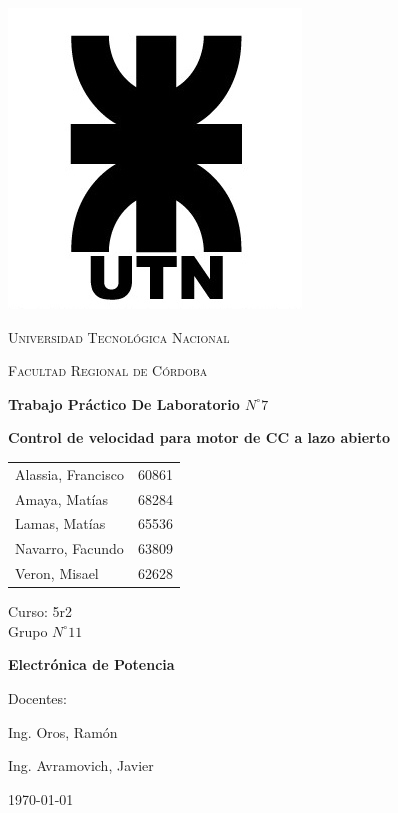 \documentclass[11pt, a4paper]{article}
\begin{document}
\begin{titlepage}
 \centering
	\includegraphics[scale=0.80]{Imagenes/LOGO.jpg} \par
 	\vspace{1cm}
 	{\scshape\LARGE Universidad Tecnológica Nacional \par}
 	{\scshape\large Facultad Regional de Córdoba \par}
 	\vspace{1cm}
	{\bfseries \Large Trabajo Práctico De Laboratorio $N^{\circ} 7$\par}
	{\bfseries \Large Control de velocidad para motor de CC a lazo abierto\par}
 	\vspace{1.5cm}

	\begin{tabular}{ll}
		Alassia, Francisco		&	60861	\\
		Amaya, Matías			&	68284	\\
		Lamas, Matías			&	65536 	\\
		Navarro, Facundo		&	63809 	\\
		Veron, Misael			&	62628
	\end{tabular}
	
	\vspace{1cm}
	Curso: 5r2 \\
	Grupo $N^{\circ} 11$
 	\vfill
	{\bfseries \Large Electrónica de Potencia \par}

	\vspace{1.5cm}
	Docentes: \par
	Ing. Oros, Ramón \par
	Ing. Avramovich, Javier \par

 	\vfill
	{\large \today\par}
\end{titlepage}
	
\end{document}
